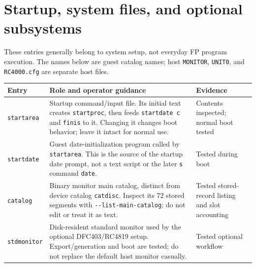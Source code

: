 \section{Startup, system files, and optional subsystems}\label{startup-system-files-and-optional-subsystems}

These entries generally belong to system setup, not everyday FP program execution. The names below are guest catalog names; host \passthrough{\lstinline!MONITOR!}, \passthrough{\lstinline!UNIT0!}, and \passthrough{\lstinline!RC4000.cfg!} are separate host files.

\begin{longtable}[]{@{}
  >{\raggedright\arraybackslash}p{}
  >{\raggedright\arraybackslash}p{}
  >{\raggedright\arraybackslash}p{}@{}}
\toprule\noalign{}
\begin{minipage}[b]{\linewidth}\raggedright
Entry
\end{minipage} & \begin{minipage}[b]{\linewidth}\raggedright
Role and operator guidance
\end{minipage} & \begin{minipage}[b]{\linewidth}\raggedright
Evidence
\end{minipage} \\
\midrule\noalign{}
\endhead
\bottomrule\noalign{}
\endlastfoot
\passthrough{\lstinline!startarea!} & Startup command/input file. Its initial text creates \passthrough{\lstinline!startproc!}, then feeds \passthrough{\lstinline!startdate c!} and \passthrough{\lstinline!finis!} to it. Changing it changes boot behavior; leave it intact for normal use. & Contents inspected; normal boot tested \\
\passthrough{\lstinline!startdate!} & Guest date-initialization program called by \passthrough{\lstinline!startarea!}. This is the source of the startup date prompt, not a text script or the later \passthrough{\lstinline!s!} command \passthrough{\lstinline!date!}. & Tested during boot \\
\passthrough{\lstinline!catalog!} & Binary monitor main catalog, distinct from device catalog \passthrough{\lstinline!catdisc!}. Inspect its 72 stored segments with \passthrough{\lstinline!--list-main-catalog!}; do not edit or treat it as text. & Tested stored-record listing and slot accounting \\
\passthrough{\lstinline!stdmonitor!} & Disk-resident standard monitor used by the optional DFC403/RC4819 setup. Export/generation and boot are tested; do not replace the default host monitor casually. & Tested optional workflow \\

\end{longtable}
